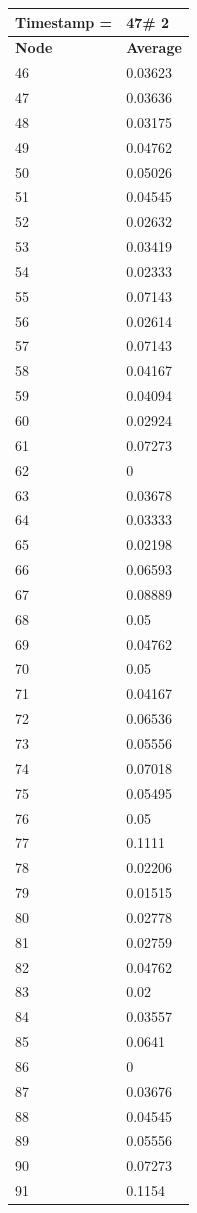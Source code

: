 \begin{tabular}{|l||l|}
\hline
\textbf{Timestamp =} & \textbf{47}\# 2\\\hline
	\textbf{Node} & \textbf{Average} \\ \hline
\hline
	46 & 0.03623 \\ \hline
	47 & 0.03636 \\ \hline
	48 & 0.03175 \\ \hline
	49 & 0.04762 \\ \hline
	50 & 0.05026 \\ \hline
	51 & 0.04545 \\ \hline
	52 & 0.02632 \\ \hline
	53 & 0.03419 \\ \hline
	54 & 0.02333 \\ \hline
	55 & 0.07143 \\ \hline
	56 & 0.02614 \\ \hline
	57 & 0.07143 \\ \hline
	58 & 0.04167 \\ \hline
	59 & 0.04094 \\ \hline
	60 & 0.02924 \\ \hline
	61 & 0.07273 \\ \hline
	62 & 0 \\ \hline
	63 & 0.03678 \\ \hline
	64 & 0.03333 \\ \hline
	65 & 0.02198 \\ \hline
	66 & 0.06593 \\ \hline
	67 & 0.08889 \\ \hline
	68 & 0.05 \\ \hline
	69 & 0.04762 \\ \hline
	70 & 0.05 \\ \hline
	71 & 0.04167 \\ \hline
	72 & 0.06536 \\ \hline
	73 & 0.05556 \\ \hline
	74 & 0.07018 \\ \hline
	75 & 0.05495 \\ \hline
	76 & 0.05 \\ \hline
	77 & 0.1111 \\ \hline
	78 & 0.02206 \\ \hline
	79 & 0.01515 \\ \hline
	80 & 0.02778 \\ \hline
	81 & 0.02759 \\ \hline
	82 & 0.04762 \\ \hline
	83 & 0.02 \\ \hline
	84 & 0.03557 \\ \hline
	85 & 0.0641 \\ \hline
	86 & 0 \\ \hline
	87 & 0.03676 \\ \hline
	88 & 0.04545 \\ \hline
	89 & 0.05556 \\ \hline
	90 & 0.07273 \\ \hline
	91 & 0.1154 \\ \hline
\end{tabular}
